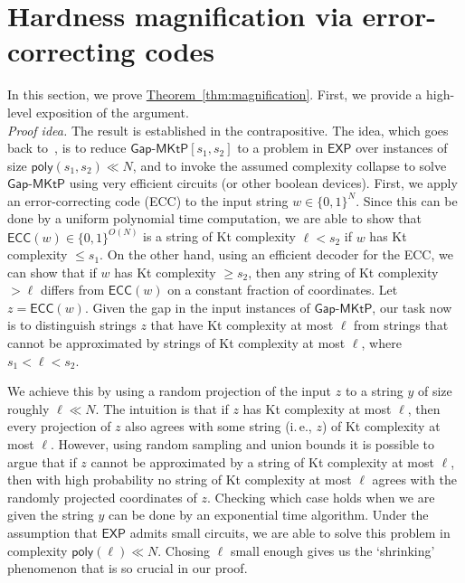 \documentclass[11pt]{article}
\numberwithin{equation}{section}
\theoremstyle{definition}
\theoremstyle{plain}
\newcommand{\ie}{i.\,e.}
\newcommand{\expref}[2]{\hyperref[#2]{#1~\ref{#2}}}
\newcommand{\gapmktp}{\mathsf{Gap}$-$\mathsf{MKtP}}
\begin{document}
\section{Hardness magnification via error-correcting codes}\label{s:magnification}

In this section, we prove \expref{Theorem}{thm:magnification}. First, we provide a high-level exposition of the argument.\\

\noindent \emph{Proof idea.} The result is established in the contrapositive. The idea, which goes back to~\cite[Theorem 3]{OS18}, is to reduce $\gapmktp[s_1,s_2]$ to a problem in $\mathsf{EXP}$ over instances of size $\mathsf{poly}(s_1,s_2) \ll N$, and to invoke the assumed complexity collapse to solve $\gapmktp$ using very efficient circuits (or other boolean devices). First, we apply an error-correcting code (ECC) to the input string $w \in \{0,1\}^N$. Since this can be done by a uniform polynomial time computation, we are able to show that $\mathsf{ECC}(w) \in \{0,1\}^{O(N)}$ is a string of Kt complexity $\ell < s_2$ if $w$ has Kt complexity $\leq s_1$. On the other hand, using an efficient decoder for the ECC, we can show that if $w$ has Kt complexity $\geq s_2$, then any string of Kt complexity $> \ell$ differs from $\mathsf{ECC}(w)$ on a constant fraction of coordinates. Let $z = \mathsf{ECC}(w)$. Given the gap in the input instances of $\gapmktp$, our task now is to distinguish strings $z$ that have Kt complexity at most $\ell$ from strings that cannot be approximated by strings of Kt complexity at most $\ell$, where $s_1 < \ell < s_2$.

We achieve this by using a random projection of the input $z$ to a string $y$ of size roughly $\ell \ll N$. The intuition is that if $z$ has Kt complexity at most $\ell$, then every projection of $z$ also agrees with some string (\ie, $z$) of Kt complexity at most $\ell$. However, using random sampling and union bounds it is possible to argue that if $z$ cannot be approximated by a string of Kt complexity at most $\ell$, then with high probability no string of Kt complexity at most $\ell$ agrees with the randomly projected coordinates of $z$. Checking which case holds when we are given the string $y$ can be done by an exponential time algorithm. Under the assumption that $\mathsf{EXP}$ admits small circuits, we are able to solve this problem in complexity $\mathsf{poly}(\ell) \ll N$. Chosing $\ell$ small enough gives us the `shrinking' phenomenon that is so crucial in our proof.
\end{document}
